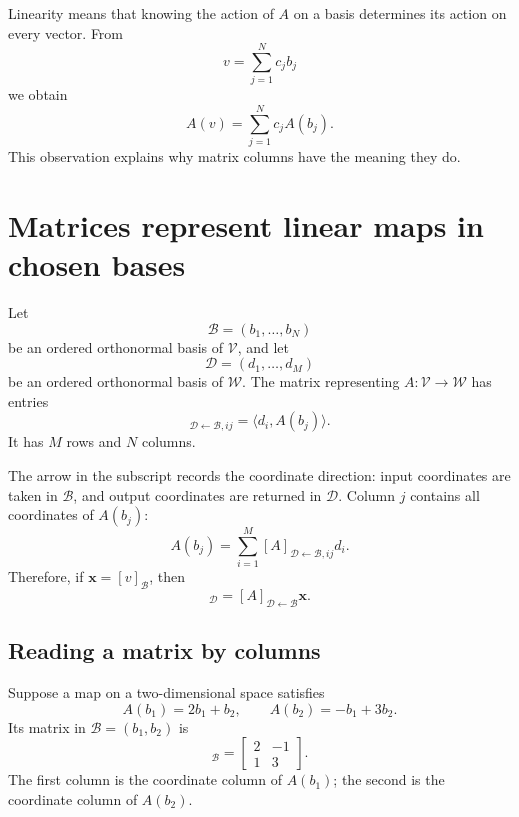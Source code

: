 Linearity means that knowing the action of \(A\) on a basis determines its
action on every vector. From
\begin{equation}
  v=\sum_{j=1}^{N}c_jb_j
\end{equation}
we obtain
\begin{equation}
  A(v)=\sum_{j=1}^{N}c_jA(b_j).
  \label{eq:training-linearity-on-basis}
\end{equation}
This observation explains why matrix columns have the meaning they do.

\section{Matrices represent linear maps in chosen bases}

Let
\begin{equation}
  \mathcal B=(b_1,\ldots,b_N)
\end{equation}
be an ordered orthonormal basis of \(\mathcal V\), and let
\begin{equation}
  \mathcal D=(d_1,\ldots,d_M)
\end{equation}
be an ordered orthonormal basis of \(\mathcal W\). The matrix representing
\(A:\mathcal V\rightarrow\mathcal W\) has entries
\begin{equation}
  [A]_{\mathcal D\leftarrow\mathcal B,ij}
  =\langle d_i,A(b_j)\rangle.
  \label{eq:training-map-matrix-elements}
\end{equation}
It has \(M\) rows and \(N\) columns.

The arrow in the subscript records the coordinate direction: input coordinates
are taken in \(\mathcal B\), and output coordinates are returned in
\(\mathcal D\). Column \(j\) contains all coordinates of \(A(b_j)\):
\begin{equation}
  A(b_j)
  =\sum_{i=1}^{M}
   [A]_{\mathcal D\leftarrow\mathcal B,ij}d_i.
\end{equation}
Therefore, if \(\mathbf x=[v]_{\mathcal B}\), then
\begin{equation}
  [A(v)]_{\mathcal D}
  =[A]_{\mathcal D\leftarrow\mathcal B}\mathbf x.
  \label{eq:training-matrix-action}
\end{equation}

\subsection{Reading a matrix by columns}

Suppose a map on a two-dimensional space satisfies
\begin{equation}
  A(b_1)=2b_1+b_2,
  \qquad
  A(b_2)=-b_1+3b_2.
\end{equation}
Its matrix in \(\mathcal B=(b_1,b_2)\) is
\begin{equation}
  [A]_{\mathcal B}
  =\begin{bmatrix}
    2 & -1\\
    1 & 3
  \end{bmatrix}.
\end{equation}
The first column is the coordinate column of \(A(b_1)\); the second is the
coordinate column of \(A(b_2)\).


